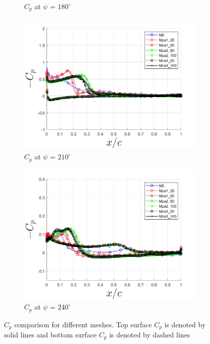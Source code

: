 \begin{figure}[H]
\begin{subfigure}[b]{0.475\textwidth}
\caption{ $C_p$ at $\psi$ = $180^\circ$}
\label{fig:zonal_Cp_180}
\end{subfigure}
\begin{subfigure}[b]{0.475\textwidth}
\centering
\includegraphics[width=1\textwidth]{figures/zonal_adapt_results/Cp/phase_210.png}
\caption{ $C_p$ at $\psi$ = $210^\circ$}
\label{fig:zonal_Cp_210}
\end{subfigure}
\begin{subfigure}[b]{0.475\textwidth}
\centering
\includegraphics[width=1\textwidth]{figures/zonal_adapt_results/Cp/phase_240.png}
\caption{ $C_p$ at $\psi$ = $240^\circ$}
\label{fig:zonal_Cp_240}
\end{subfigure}
\caption{$C_p$ comparison for different meshes. Top surface $C_p$ is denoted by solid lines and bottom surface $C_p$ is denoted by dashed lines}
\label{fig:zonal_Cp_plots_LEV}
\end{figure}


